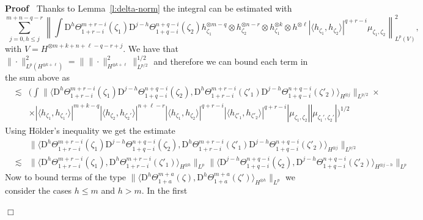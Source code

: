 \documentclass[a4paper,11pt]{article}
\newcommand{\cdummy}{\cdot}
\newcommand{\mathD}{\mathrm{D}}
\newcommand{\nobracket}{}
\newenvironment{proof}{\noindent\textbf{Proof\ }}{\hspace*{\fill}$\Box$\medskip}
\begin{document}
\begin{proof}
  Thanks to Lemma~\ref{l:delta-norm} the integral can be estimated with
  \[ \sum_{j = 0, h \leqslant j}^{m + n - q - r} \left\| \int \mathD^h
     \Theta^{m + r - i}_{1 + r - i} (\zeta_1) \mathD^{j - h} \Theta_{1 + q -
     i}^{n + q - i} (\zeta_2) h_{\zeta_1}^{\otimes m - q} \otimes h^{\otimes n
     - r}_{\zeta_2} \otimes h^{\otimes k}_{\zeta_1} \otimes h^{\otimes \ell} |
     \langle h_{\zeta_1}, h_{\zeta_2} \rangle |^{q + r - i} \mu_{\zeta_1,
     \zeta_2} \right\|^2_{L^p (V)}, \]
  with $V = H^{\otimes m + k + n + \ell - q - r + j}$. We have that $\|
  \cdummy \|_{L^p (H^{\otimes k + \ell})}^2 = \| \| \cdummy \|^2_{H^{\otimes k
  + \ell}} \|_{L^{p / 2}}^{1 / 2}$ and therefore we can bound each term in the
  sum above as
  \begin{eqnarray*}
    & \lesssim & (\int_{} \| \langle \mathD^h \Theta^{m + r - i}_{1 + r - i}
    (\zeta_1) \mathD^{j - h} \Theta_{1 + q - i}^{n + q - i} (\zeta_2),
    \mathD^h \Theta^{m + r - i}_{1 + r - i} (\zeta'_1) \mathD^{j - h}
    \Theta_{1 + q - i}^{n + q - i} (\zeta'_2) \rangle_{H^{\otimes j}} \|_{L^{p
    / 2}} \times\\
    &  & \times \nobracket | \langle h_{\zeta_1}, h_{\zeta_1'} \rangle |^{m +
    k - q} | \langle h_{\zeta_2}, h_{\zeta_2'} \rangle |^{n + \ell - r} |
    \langle h_{\zeta_1}, h_{\zeta_2} \rangle |^{q + r - i} | \langle
    h_{\zeta'_1}, h_{\zeta'_2} \rangle |^{q + r - i} | \mu_{\zeta_1, \zeta_2}
    | | \mu_{\zeta_1', \zeta_2'} |)^{1 / 2}
  \end{eqnarray*}
  Using H{\"o}lder's inequality we get the estimate
  \begin{eqnarray*}
    &  & \| \langle \mathD^h \Theta^{m + r - i}_{1 + r - i} (\zeta_1)
    \mathD^{j - h} \Theta_{1 + q - i}^{n + q - i} (\zeta_2), \mathD^h
    \Theta^{m + r - i}_{1 + r - i} (\zeta'_1) \mathD^{j - h} \Theta_{1 + q -
    i}^{n + q - i} (\zeta'_2) \rangle_{H^{\otimes j}} \|_{L^{p / 2}}\\
    & \lesssim & \| \langle \mathD^h \Theta^{m + r - i}_{1 + r - i}
    (\zeta_1), \mathD^h \Theta^{m + r - i}_{1 + r - i} (\zeta'_1)
    \rangle_{H^{\otimes h}} \|_{L^p} \| \langle \mathD^{j - h} \Theta_{1 + q -
    i}^{n + q - i} (\zeta_2), \mathD^{j - h} \Theta_{1 + q - i}^{n + q - i}
    (\zeta'_2) \rangle_{H^{\otimes j - h}} \|_{L^p}
  \end{eqnarray*}
  Now to bound terms of the type $\| \langle \mathD^h \Theta_{1 + a}^{m + a}
  (\zeta), \mathD^h \Theta_{1 + a}^{m + a} (\zeta') \rangle_{H^{\otimes h}}
  \|_{L^p}$ we consider the cases $h \leqslant m$ and $h > m$. In the first

\end{proof}
\end{document}
